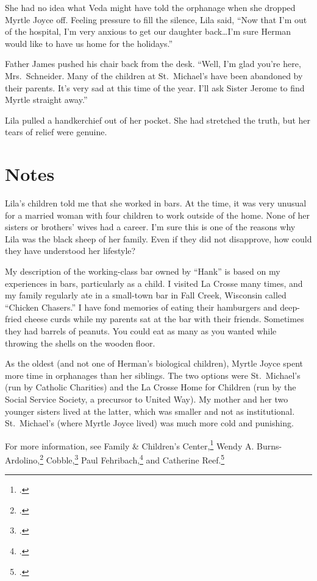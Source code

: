 \documentclass[
  american,
  letterpaper,
]{book}
\begin{document}
She had no idea what Veda might have told the orphanage when she dropped
Myrtle Joyce off. Feeling pressure to fill the silence, Lila said, ``Now
that I'm out of the hospital, I'm very anxious to get our daughter
back\ldots I'm sure Herman would like to have us home for the
holidays.''

Father James pushed his chair back from the desk. ``Well, I'm glad
you're here, Mrs.~Schneider. Many of the children at St.~Michael's have
been abandoned by their parents. It's very sad at this time of the year.
I'll ask Sister Jerome to find Myrtle straight away.''

Lila pulled a handkerchief out of her pocket. She had stretched the
truth, but her tears of relief were genuine.

\section{Notes}\label{notes-50}

Lila's children told me that she worked in bars. At the time, it was
very unusual for a married woman with four children to work outside of
the home. None of her sisters or brothers' wives had a career. I'm sure
this is one of the reasons why Lila was the black sheep of her family.
Even if they did not disapprove, how could they have understood her
lifestyle?

My description of the working-class bar owned by ``Hank'' is based on my
experiences in bars, particularly as a child. I visited La Crosse many
times, and my family regularly ate in a small-town bar in Fall Creek,
Wisconsin called ``Chicken Chasers.'' I have fond memories of eating
their hamburgers and deep-fried cheese curds while my parents sat at the
bar with their friends. Sometimes they had barrels of peanuts. You could
eat as many as you wanted while throwing the shells on the wooden floor.

As the oldest (and not one of Herman's biological children), Myrtle
Joyce spent more time in orphanages than her siblings. The two options
were St.~Michael's (run by Catholic Charities) and the La Crosse Home
for Children (run by the Social Service Society, a precursor to United
Way). My mother and her two younger sisters lived at the latter, which
was smaller and not as institutional. St.~Michael's (where Myrtle Joyce
lived) was much more cold and punishing.

For more information, see Family \& Children's Center,\footnote{.} Wendy A.
Burns-Ardolino,\footnote{.}
Cobble,\footnote{.}
Paul Fehribach,\footnote{.} and Catherine Reef.\footnote{.}
\end{document}
